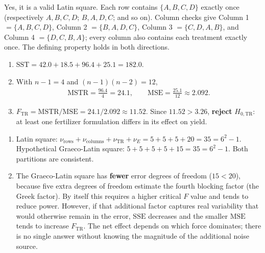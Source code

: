 \begin{solproblema}[prob:8e9e6f8]
Yes, it is a valid Latin square. Each row contains $\{A,B,C,D\}$ exactly once (respectively $A,B,C,D$; $B,A,D,C$; and so on). Column checks give Column 1 $=\{A,B,C,D\}$, Column 2 $=\{B,A,D,C\}$, Column 3 $=\{C,D,A,B\}$, and Column 4 $=\{D,C,B,A\}$; every column also contains each treatment exactly once. The defining property holds in both directions.
\end{solproblema}

\begin{solproblema}[prob:f64d8dc]
\begin{enumerate}
\item $\text{SST}=42.0+18.5+96.4+25.1=182.0$.
\item With $n-1=4$ and $(n-1)(n-2)=12$,
\begin{align}
\text{MSTR}=\frac{96.4}{4}=24.1,\qquad \text{MSE}=\frac{25.1}{12}\approx2.092.
\end{align}
\item $F_{\text{TR}}=\text{MSTR}/\text{MSE}=24.1/2.092\approx11.52$. Since $11.52>3.26$, \textbf{reject} $H_{0,\text{TR}}$: at least one fertilizer formulation differs in its effect on yield.
\end{enumerate}
\end{solproblema}

\begin{solproblema}[prob:68ab492]
\begin{enumerate}
\item Latin square: $\nu_{\text{rows}}+\nu_{\text{columns}}+\nu_{\text{TR}}+\nu_E=5+5+5+20=35=6^2-1$. Hypothetical Graeco-Latin square: $5+5+5+5+15=35=6^2-1$. Both partitions are consistent.
\item The Graeco-Latin square has \textbf{fewer} error degrees of freedom ($15<20$), because five extra degrees of freedom estimate the fourth blocking factor (the Greek factor). By itself this requires a higher critical $F$ value and tends to reduce power. However, if that additional factor captures real variability that would otherwise remain in the error, $\text{SSE}$ decreases and the smaller $\text{MSE}$ tends to increase $F_{\text{TR}}$. The net effect depends on which force dominates; there is no single answer without knowing the magnitude of the additional noise source.
\end{enumerate}
\end{solproblema}

